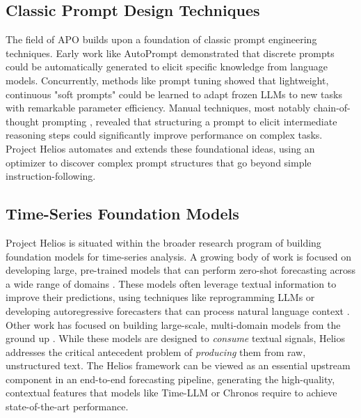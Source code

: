 \documentclass{article}
\begin{document}
\subsection{Classic Prompt Design Techniques}
The field of APO builds upon a foundation of classic prompt engineering techniques. Early work like AutoPrompt \citep{shin2020autopromptelicitingknowledgelanguage} demonstrated that discrete prompts could be automatically generated to elicit specific knowledge from language models. Concurrently, methods like prompt tuning \citep{lester2021powerscaleparameterefficientprompt} showed that lightweight, continuous "soft prompts" could be learned to adapt frozen LLMs to new tasks with remarkable parameter efficiency. Manual techniques, most notably chain-of-thought prompting \citep{wei2023chainofthoughtpromptingelicitsreasoning}, revealed that structuring a prompt to elicit intermediate reasoning steps could significantly improve performance on complex tasks. Project Helios automates and extends these foundational ideas, using an optimizer to discover complex prompt structures that go beyond simple instruction-following.

\subsection{Time-Series Foundation Models}
Project Helios is situated within the broader research program of building foundation models for time-series analysis. A growing body of work is focused on developing large, pre-trained models that can perform zero-shot forecasting across a wide range of domains \citep{ansari2024chronoslearninglanguagetime, das2024decoderonlyfoundationmodeltimeseries}. These models often leverage textual information to improve their predictions, using techniques like reprogramming LLMs \citep{jin2024timellmtimeseriesforecasting} or developing autoregressive forecasters that can process natural language context \citep{liu2024autotimesautoregressivetimeseries}. Other work has focused on building large-scale, multi-domain models from the ground up \citep{xiao2025timefoundfoundationmodeltime, shi2025timemoebillionscaletimeseries}. While these models are designed to \textit{consume} textual signals, Helios addresses the critical antecedent problem of \textit{producing} them from raw, unstructured text. The Helios framework can be viewed as an essential upstream component in an end-to-end forecasting pipeline, generating the high-quality, contextual features that models like Time-LLM or Chronos require to achieve state-of-the-art performance.
\end{document}

